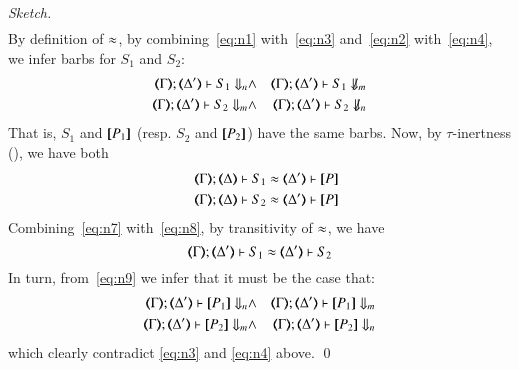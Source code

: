 \begin{proof}[Sketch]
\begin{eqnarray}
	\end{eqnarray}
	By definition of $\approx$, 
	by combining~\eqref{eq:n1} with~\eqref{eq:n3}
	and~\eqref{eq:n2} with~\eqref{eq:n4}, we infer barbs for $S_1$ and $S_2$:
	\begin{eqnarray}
		\mapt{\Gamma}; \mapt{\Delta'} \proves S_1 \Barb{n} & \land & 
		\mapt{\Gamma}; \mapt{\Delta'} \proves S_1 \nBarb{m} \label{eq:n5} \\
		\mapt{\Gamma}; \mapt{\Delta'} \proves S_2 \Barb{m} & \land & 
		\mapt{\Gamma}; \mapt{\Delta'} \proves S_2 \nBarb{n} \label{eq:n6}
	\end{eqnarray}
	That is, $S_1$ and $[\!\![P_1]\!\!]$ 
	(resp. $S_2$ and $[\!\![P_2]\!\!]$)
	have the same barbs.
	Now, by $\tau$-inertness (), we have both 
	\begin{eqnarray}
		& & \horel{\mapt{\Gamma}}{\mapt{\Delta}}{S_1}{\wb}{\mapt{\Delta'}}{\map{P}} \label{eq:n7} \\
		& & \horel{\mapt{\Gamma}}{\mapt{\Delta}}{S_2}{\wb}{\mapt{\Delta'}}{\map{P}} \label{eq:n8}
	\end{eqnarray}
	Combining~\eqref{eq:n7} with~\eqref{eq:n8}, by transitivity of $\approx$,
	we have 
	\begin{equation}
		\horel{\mapt{\Gamma}}{\mapt{\Delta'}}{S_1}{\wb}{\mapt{\Delta'}}{S_2} \label{eq:n9}
	\end{equation}
	In turn, from~\eqref{eq:n9}
	we infer that 
	it must be the case that:
	\begin{eqnarray*}
		\mapt{\Gamma}; \mapt{\Delta'} \proves \map{P_1} \Barb{n} & \land & 
		\mapt{\Gamma}; \mapt{\Delta'} \proves \map{P_1} \Barb{m} \label{eq:n10} \\
		\mapt{\Gamma}; \mapt{\Delta'} \proves \map{P_2} \Barb{m} & \land & 
		\mapt{\Gamma}; \mapt{\Delta'} \proves \map{P_2} \Barb{n} \label{eq:n11}
	\end{eqnarray*}
	which clearly contradict \eqref{eq:n3} and \eqref{eq:n4} above.
	\qed
\end{proof}

